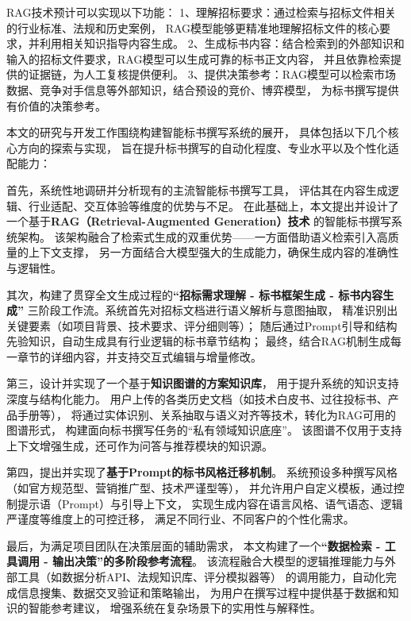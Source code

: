 \documentclass{xmu}
\begin{document}
RAG技术预计可以实现以下功能：
1、理解招标要求：通过检索与招标文件相关的行业标准、法规和历史案例，
RAG模型能够更精准地理解招标文件的核心要求，并利用相关知识指导内容生成。
2、生成标书内容：结合检索到的外部知识和输入的招标文件要求，RAG模型可以生成可靠的标书正文内容，
并且依靠检索提供的证据链，为人工复核提供便利。
3、提供决策参考：RAG模型可以检索市场数据、竞争对手信息等外部知识，结合预设的竞价、博弈模型，
为标书撰写提供有价值的决策参考。

本文的研究与开发工作围绕构建智能标书撰写系统的展开，
具体包括以下几个核心方向的探索与实现，
旨在提升标书撰写的自动化程度、专业水平以及个性化适配能力：

首先，系统性地调研并分析现有的主流智能标书撰写工具，
评估其在内容生成逻辑、行业适配、交互体验等维度的优势与不足。
在此基础上，本文提出并设计了一个基于{\bf RAG（Retrieval-Augmented Generation）技术}
的智能标书撰写系统架构。
该架构融合了检索式生成的双重优势——一方面借助语义检索引入高质量的上下文支撑，
另一方面结合大模型强大的生成能力，确保生成内容的准确性与逻辑性。

其次，构建了贯穿全文生成过程的{\bf “招标需求理解 - 标书框架生成 - 标书内容生成”}
三阶段工作流。系统首先对招标文档进行语义解析与意图抽取，
精准识别出关键要素（如项目背景、技术要求、评分细则等）；
随后通过Prompt引导和结构先验知识，自动生成具有行业逻辑的标书章节结构；
最终，结合RAG机制生成每一章节的详细内容，并支持交互式编辑与增量修改。

第三，设计并实现了一个基于{\bf 知识图谱的方案知识库}，
用于提升系统的知识支持深度与结构化能力。
用户上传的各类历史文档（如技术白皮书、过往投标书、产品手册等），
将通过实体识别、关系抽取与语义对齐等技术，转化为RAG可用的图谱形式，
构建面向标书撰写任务的“私有领域知识底座”。
该图谱不仅用于支持上下文增强生成，还可作为问答与推荐模块的知识源。

第四，提出并实现了{\bf 基于Prompt的标书风格迁移机制}。
系统预设多种撰写风格（如官方规范型、营销推广型、技术严谨型等），
并允许用户自定义模板，通过控制提示语（Prompt）与引导上下文，
实现生成内容在语言风格、语气语态、逻辑严谨度等维度上的可控迁移，
满足不同行业、不同客户的个性化需求。

最后，为满足项目团队在决策层面的辅助需求，
本文构建了一个{\bf “数据检索 - 工具调用 - 输出决策”的多阶段参考流程}。
该流程融合大模型的逻辑推理能力与外部工具（如数据分析API、法规知识库、评分模拟器等）
的调用能力，自动化完成信息搜集、数据交叉验证和策略输出，
为用户在撰写过程中提供基于数据和知识的智能参考建议，
增强系统在复杂场景下的实用性与解释性。
\end{document}
